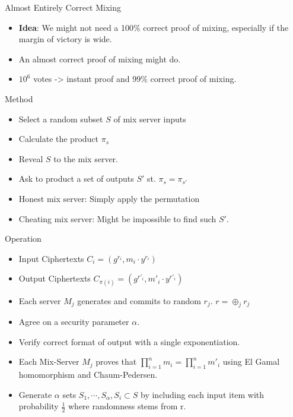 \documentclass{beamer}
\begin{document}
\begin{frame}[allowframebreaks]{Almost Entirely Correct Mixing \cite{BG02}}

\begin{itemize}
\item \textbf{Idea}: We might not need a 100\% correct proof of mixing, especially if the margin of victory is wide.
\item An almost correct proof of mixing might do.
\item $10^6$ votes -> instant proof and 99\% correct proof of mixing.
\end{itemize}

\begin{block}{Method}
\begin{itemize}
\item Select a random subset $S$ of mix server inputs
\item Calculate the product $\pi_s$
\item Reveal $S$ to the mix server.
\item Ask to product a set of outputs $S'$ st. $\pi_s = \pi_{s'}$
\item Honest mix server:  Simply apply the permutation
\item Cheating mix server: Might be impossible to find such $S'$.
\end{itemize}
\end{block}

\begin{block}{Operation}
\begin{itemize}
\item  Input Ciphertexts $C_i = (g^{r_{i}},m_i \cdot y^{r_{i}})$
\item  Output Ciphertexts $C_{\pi(i)} = (g^{r'_{i}},m'_i \cdot y^{r'_{i}})$
\item Each server $M_j$ generates and commits to random $r_j$. $r = \oplus_j r_j$
\item Agree on a security parameter $\alpha$.
\item Verify correct format of output with a single exponentiation.
\item Each Mix-Server $M_j$ proves that $ \prod_{i=1}^n m_i =  \prod_{i=1}^n m'_i $ using El Gamal homomorphism and Chaum-Pedersen.
\item Generate $\alpha$ sets $S_1,\cdots,S_{\alpha}, S_i \subset S$ by including each input item with probability $\frac{1}{2}$ where randomness stems from r.
\end{itemize}
\end{block}



\end{frame}
\end{document}
